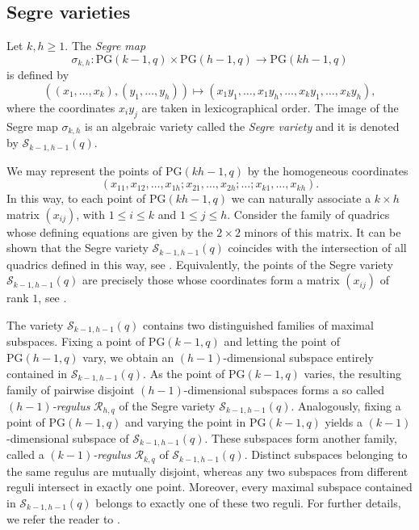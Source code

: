 \documentclass[11pt]{article}
\theoremstyle{definition}
\numberwithin{equation}{section}
\def\cR{\mathcal R}
\def\PG{\mathrm{PG}}
\begin{document}
\subsection{Segre varieties}



Let $k,h\ge 1$. The \emph{Segre map}
\[
\sigma_{k,h} : \PG(k-1,q)\times \PG(h-1,q)
\longrightarrow \PG(kh-1,q)
\]
is defined by
\[
\left((x_1,\ldots,x_k),(y_1,\ldots,y_h)\right) \mapsto (x_1y_1,\ldots,x_1y_h,\ldots,x_ky_1,\ldots,x_ky_h),
\]
where the coordinates $x_i y_j$ are taken in lexicographical order.
The image of the Segre map $\sigma_{k,h}$ is an algebraic variety called the \emph{Segre variety} and it is denoted by
$\mathcal S_{k-1,h-1}(q)$.

\noindent We may represent the points of $\PG(kh-1,q)$ by the homogeneous coordinates \[
(x_{11},x_{12},\ldots,x_{1h};
    x_{21},\ldots,x_{2h};
    \ldots;
    x_{k1},\ldots,x_{kh}).
\]
In this way, to each point of $\PG(kh-1,q)$ we can naturally associate a
$k\times h$ matrix $(x_{ij})$, with $1\le i\le k$ and $1\le j\le h$.
Consider the family of quadrics whose defining equations are given by the
$2\times2$ minors of this matrix.
It can be shown that the Segre variety $\mathcal S_{k-1,h-1}(q)$ coincides with
the intersection of all quadrics defined in this way, see \cite[Theorem 4.94]{HirschfeldThas}.
Equivalently, the points of the Segre variety $\mathcal S_{k-1,h-1}(q)$ are precisely
those whose coordinates form a matrix $(x_{ij})$ of rank $1$, see \cite[Theorem 4.101]{HirschfeldThas}.

The variety $\mathcal S_{k-1,h-1}(q)$ contains
two distinguished families of maximal subspaces. Fixing a point of $\PG(k-1,q)$ and letting the point of $\PG(h-1,q)$ vary, we
obtain an $(h-1)$-dimensional subspace entirely contained in
$\mathcal S_{k-1,h-1}(q)$. As the point of $\PG(k-1,q)$ varies, the resulting
family of pairwise disjoint $(h-1)$-dimensional subspaces forms a so called
\emph{$(h-1)$-regulus} $\mathcal R_{h,q}$ of the Segre variety
$\mathcal S_{k-1,h-1}(q)$. Analogously, fixing a point of $\PG(h-1,q)$ and varying the point in
$\PG(k-1,q)$ yields a $(k-1)$-dimensional subspace of
$\mathcal S_{k-1,h-1}(q)$. These subspaces form another family, called a
\emph{$(k-1)$-regulus} $\cR_{k, q}$ of $\mathcal S_{k-1,h-1}(q)$. Distinct subspaces belonging to the same regulus are mutually disjoint, whereas any two
subspaces from different reguli intersect in exactly one point. Moreover, every
maximal subspace contained in $\mathcal S_{k-1,h-1}(q)$ belongs to exactly
one of these two reguli. For further details, we refer the reader to
\cite{harris2013algebraic,HirschfeldThas}.
\end{document}
